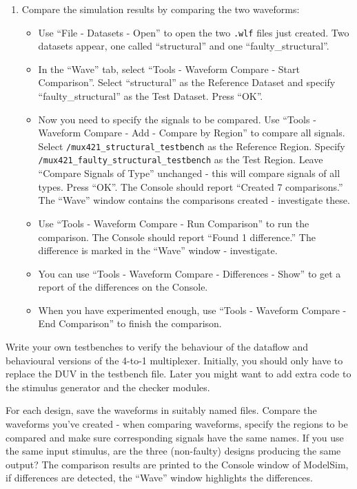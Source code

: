 \documentclass[a4paper,11pt]{article}
\begin{document}
\begin{enumerate}
\item Compare the simulation results by comparing the two waveforms: 

\begin{itemize} 
\item Use ``File - Datasets - Open'' to open the two \verb#.wlf# files just
  created. Two datasets appear, one called ``structural'' and one
  ``faulty\_structural''.
\item In the ``Wave'' tab, select ``Tools - Waveform Compare - Start
  Comparison''. Select ``structural'' as the Reference Dataset and specify
  ``faulty\_structural'' as the Test Dataset. Press ``OK''.
\item Now you need to specify the signals to be compared. Use ``Tools -
  Waveform Compare - Add - Compare by Region'' to compare all signals.
  Select \verb#/mux421_structural_testbench# as the Reference Region. Specify
  \verb#/mux421_faulty_structural_testbench# as the Test Region. Leave
  ``Compare Signals of Type'' unchanged - this will compare signals of all
  types. Press ``OK''. The Console should report ``Created 7 comparisons.'' The
  ``Wave'' window contains the comparisons created - investigate these.
\item Use ``Tools - Waveform Compare - Run Comparison'' to run the
  comparison. The Console should report ``Found 1 difference.'' The difference
  is marked in the ``Wave'' window - investigate.
\item You can use ``Tools - Waveform Compare - Differences - Show'' to get a
  report of the differences on the Console.
\item When you have experimented enough, use ``Tools - Waveform Compare -
  End Comparison'' to finish the comparison.
\end{itemize}
 
\end{enumerate}

\smallskip
{}
\smallskip

Write your own testbenches to verify the behaviour of the dataflow and
behavioural versions of the 4-to-1 multiplexer. Initially, you should only have
to replace the DUV in the testbench file. Later you might want to add extra
code to the stimulus generator and the checker modules.

For each design, save the waveforms in suitably named files. Compare the
waveforms you've created - when comparing waveforms, specify the regions to be
compared and make sure corresponding signals have the same names. If you use
the same input stimulus, are the three (non-faulty) designs producing the same
output? The comparison results are printed to the Console window of ModelSim,
if differences are detected, the ``Wave'' window highlights the differences.
\end{document}
